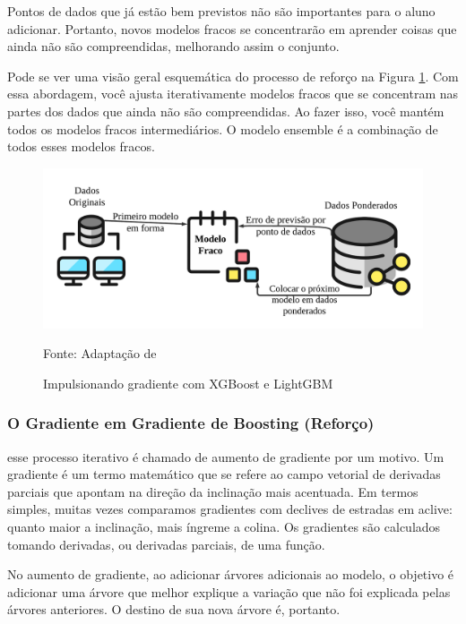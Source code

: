 Pontos de dados que já estão bem previstos não são importantes para o aluno adicionar. Portanto, novos modelos fracos se concentrarão em aprender coisas que ainda não são compreendidas, melhorando assim o conjunto.

Pode se ver uma visão geral esquemática do processo de reforço na Figura \ref{fig:xgboos}. Com essa abordagem, você ajusta iterativamente modelos fracos que se concentram nas partes dos dados que ainda
não são compreendidas. Ao fazer isso, você mantém todos os modelos fracos intermediários. O modelo ensemble é a combinação de todos esses modelos fracos.


\begin{figure}[H]
	\centering
	\caption{Impulsionando gradiente com XGBoost e LightGBM}
	\label{fig:xgboos}
	\includegraphics[width=1\linewidth]{Modelos/Figuras/xgboos}
	
	Fonte: Adaptação de 
\end{figure}



\subsubsection{O Gradiente em Gradiente de Boosting (Refor\c co)} \label{subsubsec:boosting}

 esse processo iterativo é chamado de aumento de gradiente por um motivo. Um gradiente é um termo matemático que se refere ao campo vetorial de derivadas parciais que apontam na direção da inclinação mais acentuada. Em termos simples, muitas vezes comparamos gradientes com declives de estradas em aclive: quanto maior a inclinação, mais íngreme a colina. Os gradientes são calculados tomando derivadas, ou derivadas parciais, de uma função.

No aumento de gradiente, ao adicionar árvores adicionais ao modelo, o objetivo é adicionar uma árvore que melhor explique a variação que não foi explicada pelas árvores anteriores. O destino de sua nova árvore é, portanto.

